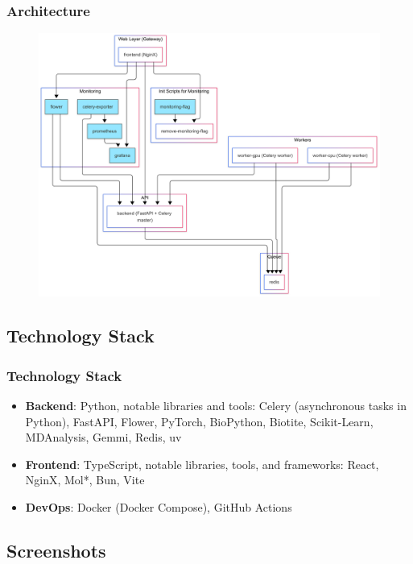 \documentclass[aspectratio=169]{beamer}
\begin{document}
\begin{frame}
  \frametitle{Architecture}
  \begin{figure}
    \centering
    \includegraphics[width=\linewidth,height=0.8\textheight,keepaspectratio]{fig/architecture.png}
  \end{figure}
\end{frame}

\subsection{Technology Stack}

\begin{frame}
  \frametitle{Technology Stack}

  \begin{itemize}
    \item \textbf{Backend}: Python, notable libraries and tools: Celery (asynchronous tasks in Python), FastAPI, Flower, PyTorch, BioPython, Biotite, Scikit-Learn, MDAnalysis, Gemmi, Redis, uv
    \item \textbf{Frontend}: TypeScript, notable libraries, tools, and frameworks: React, NginX, Mol*, Bun, Vite
    \item \textbf{DevOps}: Docker (Docker Compose), GitHub Actions
  \end{itemize}

\end{frame}

\subsection{Screenshots}
\end{document}
